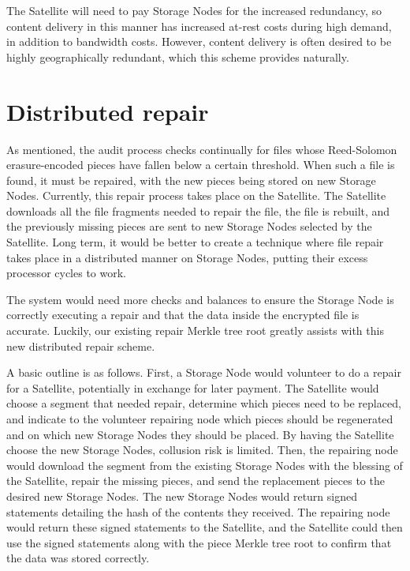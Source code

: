 \documentclass[8pt,fleqn,openany]{book}
\begin{document}
The Satellite will need to pay Storage Nodes for the increased redundancy, so
content delivery in this manner has increased at-rest costs during high
demand, in addition to bandwidth costs. However, content delivery is often
desired to be highly geographically redundant, which this scheme provides
naturally.

\section{Distributed repair}\label{sec:future-distributed-repair}

As mentioned, the audit process checks continually for files whose Reed-Solomon
erasure-encoded pieces have fallen below a certain threshold. When such a file
is found, it must be repaired, with
the new pieces being stored on new Storage Nodes.
Currently, this
repair process takes place on the Satellite. The Satellite downloads all
the file fragments needed to repair the file, the file is rebuilt, and the
previously missing pieces are sent to new Storage Nodes
selected by the Satellite.
Long term, it would be better to create a technique where file repair takes
place in a distributed manner on Storage Nodes, putting their excess processor
cycles to work.

The system would need more checks and balances to ensure the Storage Node is
correctly
executing a repair and that the data inside the encrypted file is accurate.
Luckily, our existing repair Merkle tree root greatly assists with this
new distributed repair scheme.

A basic outline is as follows. First, a Storage Node would volunteer to do
a repair for a Satellite, potentially in exchange for later payment. The
Satellite would choose a segment that needed repair, determine which pieces
need to be replaced, and indicate to the volunteer repairing node which
pieces should be regenerated and on which new Storage Nodes they should be placed.
By having the Satellite choose the new Storage Nodes, collusion risk is
limited. Then, the repairing node would download the segment from the existing
Storage Nodes with the blessing of the Satellite, repair the missing pieces,
and send the replacement pieces to the desired new Storage Nodes. The new
Storage Nodes would return signed statements detailing the hash of the contents
they received. The repairing node would return these signed statements to the
Satellite, and the Satellite could then use the signed statements along with
the piece Merkle tree root to confirm that the data was stored correctly.
\end{document}
